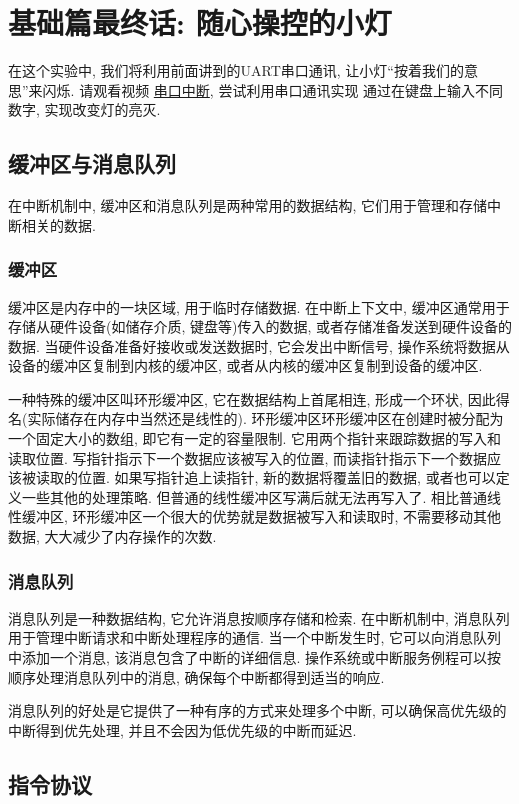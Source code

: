 
\chapter{基础篇最终话: 随心操控的小灯}

在这个实验中, 我们将利用前面讲到的UART串口通讯, 让小灯“按着我们的意思”来闪烁. 请观看视频
\href{https://www.bilibili.com/video/BV1bc411J7Tv/?p=10&share_source=copy_web&vd_source=00b9d329964a93c9843f9c524074f948}{串口中断}, 尝试利用串口通讯实现
通过在键盘上输入不同数字, 实现改变灯的亮灭.

\section{缓冲区与消息队列}
在中断机制中, 缓冲区和消息队列是两种常用的数据结构, 它们用于管理和存储中断相关的数据.
\subsection{缓冲区}
缓冲区是内存中的一块区域, 用于临时存储数据. 在中断上下文中, 缓冲区通常用于存储从硬件设备(如储存介质, 键盘等)传入的数据, 或者存储准备发送到硬件设备的数据. 当硬件设备准备好接收或发送数据时, 它会发出中断信号, 操作系统将数据从设备的缓冲区复制到内核的缓冲区, 或者从内核的缓冲区复制到设备的缓冲区.

一种特殊的缓冲区叫环形缓冲区, 它在数据结构上首尾相连, 形成一个环状, 因此得名(实际储存在内存中当然还是线性的). 环形缓冲区环形缓冲区在创建时被分配为一个固定大小的数组, 即它有一定的容量限制. 它用两个指针来跟踪数据的写入和读取位置. 写指针指示下一个数据应该被写入的位置, 而读指针指示下一个数据应该被读取的位置.
如果写指针追上读指针, 新的数据将覆盖旧的数据, 或者也可以定义一些其他的处理策略. 但普通的线性缓冲区写满后就无法再写入了.
相比普通线性缓冲区, 环形缓冲区一个很大的优势就是数据被写入和读取时, 不需要移动其他数据, 大大减少了内存操作的次数.
\subsection{消息队列}
消息队列是一种数据结构, 它允许消息按顺序存储和检索. 在中断机制中, 消息队列用于管理中断请求和中断处理程序的通信. 当一个中断发生时, 它可以向消息队列中添加一个消息, 该消息包含了中断的详细信息. 操作系统或中断服务例程可以按顺序处理消息队列中的消息, 确保每个中断都得到适当的响应.

消息队列的好处是它提供了一种有序的方式来处理多个中断, 可以确保高优先级的中断得到优先处理, 并且不会因为低优先级的中断而延迟.

\section{指令协议}

